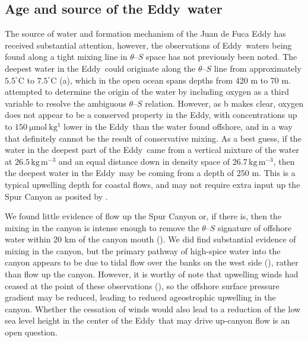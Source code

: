 \documentclass[draft]{agujournal2019}
\newcommand*{\Eddy}{{\sc Eddy}}
\begin{document}
\subsection{Age and source of the \Eddy\ water}

The source of water and formation mechanism of the Juan de Fuca Eddy has received substantial attention, however, the observations of \Eddy\ waters being found along a tight mixing line in $\theta$--$S$ space has not previously been noted.  The deepest water in the \Eddy\ could originate along the $\theta$--$S$ line from approximately $5.5^\circ \mathrm{C}$ to $7.5^\circ \mathrm{C}$ (a), which in the open ocean spans depths from 420 m to 70 m.   attempted to determine the origin of the water by including oxygen as a third variable to resolve the ambiguous $\theta$--$S$ relation.  However, as b makes clear, oxygen does not appear to be a conserved property in the \Eddy, with concentrations up to $150 \ \mathrm{\mu mol\ kg^{1}}$ lower in the \Eddy\ than the water found offshore, and in a way that definitely cannot be the result of conservative mixing.  As a best guess, if the water in the deepest part of the \Eddy\ came from a vertical mixture of the water at $26.5\,\mathrm{kg\,m^{-3}}$ and an equal distance down in density space of $26.7\,\mathrm{kg\,m^{-3}}$, then the deepest water in the \Eddy\ may be coming from a depth of 250 m.  This is a typical upwelling depth for coastal flows, and may not require extra input up the Spur Canyon as posited by .

We found little evidence of flow up the Spur Canyon or, if there is, then the mixing in the canyon is intense enough to remove the $\theta$--$S$ signature of offshore water within 20 km of the canyon mouth ().  We did find substantial evidence of mixing in the canyon, but the primary pathway of high-spice water into the canyon appears to be due to tidal flow over the banks on the west side (), rather than flow up the canyon.  However, it is worthy of note that upwelling winds had ceased at the point of these observations (), so the offshore surface pressure gradient may be reduced, leading to reduced ageostrophic upwelling in the canyon.  Whether the cessation of winds would also lead to a reduction of the low sea level height in the center of the \Eddy\ that may drive up-canyon flow is an open question.
\end{document}
